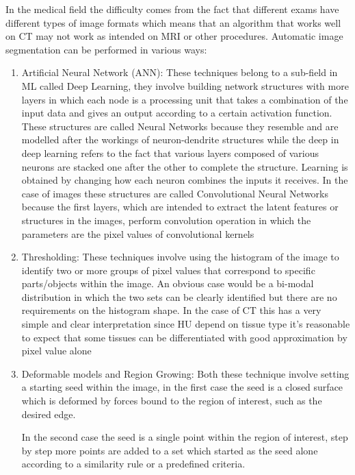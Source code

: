 In the medical field the difficulty comes from the fact that different exams have different types of image formats which means that an algorithm that works well on CT may not work as intended on MRI or other procedures.
Automatic image segmentation can be performed in various ways:

\begin{enumerate}
\item Artificial Neural Network (ANN): These techniques belong to a sub-field in ML called Deep Learning, they involve building network structures with more layers in which each node is a processing unit that takes a combination of the input data and gives an output according to a certain activation function. These structures are called Neural Networks because they resemble and are modelled after the workings of neuron-dendrite structures while the deep in deep learning refers to the fact that various layers composed of various neurons are stacked one after the other to complete the structure. Learning is obtained by changing how each neuron combines the inputs it receives. In the case of images these structures are called Convolutional Neural Networks because the first layers, which are intended to extract the latent features or structures in the images, perform convolution operation in which the parameters are the pixel values of convolutional kernels

\item Thresholding: These techniques involve using the histogram of the image to identify two or more groups of pixel values that correspond to specific parts/objects within the image. An obvious case would be a bi-modal distribution in which the two sets can be clearly identified but there are no requirements on the histogram shape.  In the case of CT this has a very simple and clear interpretation since HU depend on tissue type it's reasonable to expect that some tissues can be differentiated with good approximation by pixel value alone

\item Deformable models and Region Growing: Both these technique involve setting a starting seed within the image, in the first case the seed is a closed surface which is deformed by forces bound to the region of interest, such as the desired edge.

In the second case the seed is a single point within the region of interest, step by step more points are added to a set which started as the seed alone according to a similarity rule  or a predefined criteria.


\end{enumerate}
